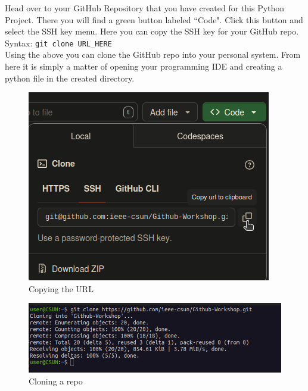 \documentclass[12pt, a4paper]{article}
\begin{document}
Head over to your GitHub Repository that you have created for this Python Project. There you will find a green button labeled ``Code". Click this button and select the SSH key menu. Here you can copy the SSH key for your GitHub repo. \\

Syntax: \texttt{git clone URL\_HERE}\\

Using the above you can clone the GitHub repo into your personal system. From here it is simply a matter of opening your programming IDE and creating a python file in the created directory.
\begin{figure}[H]
\centering
\includegraphics[scale=0.5]{../images/workshop-I/GH-URL.png}
\caption{Copying the URL}
\end{figure}
\begin{figure}[H]
\centering
\includegraphics[scale=0.5]{../images/workshop-I/git-clone.png}
\caption{Cloning a repo}
\end{figure}
\end{document}
